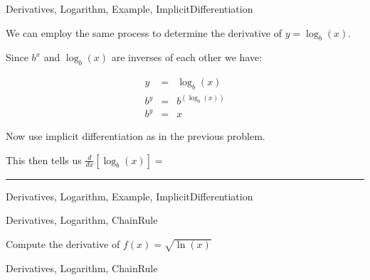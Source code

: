 \begin{tagblock}{Derivatives, Logarithm, Example, ImplicitDifferentiation}
\begin{question}

 We can employ the same process to determine the derivative of  $y = \log_b(x)$.  
 
 Since $b^x$ and $\log_b(x)$ are inverses of each other we have:
 
 \begin{eqnarray*} y &=& \log_b(x) \\
 b^y & = & b^(\log_b(x)) \\
 b^y & = & x \end{eqnarray*}
 
 Now use implicit differentiation as in the previous problem.

 \vspace{2in}
 
 This then tells us $\frac{d}{dx}[\log_b(x)] = $ \rule[-0.1cm]{2.5cm}{0.01cm}


	
\begin{tags}
	   Derivatives, Logarithm, Example, ImplicitDifferentiation
\end{tags}
	
\begin{diary}
\end{diary}
	
\begin{solution}
	   
\end{solution}
	
\end{question}

\end{tagblock}


\begin{tagblock}{Derivatives, Logarithm, ChainRule}
\begin{question}

 Compute the derivative of $f(x) = \sqrt{\ln(x)}$


	
\begin{tags}
	   Derivatives, Logarithm, ChainRule
\end{tags}
	
\begin{diary}
\end{diary}
	
\begin{solution}
	   
\end{solution}
	
\end{question}

\end{tagblock}

